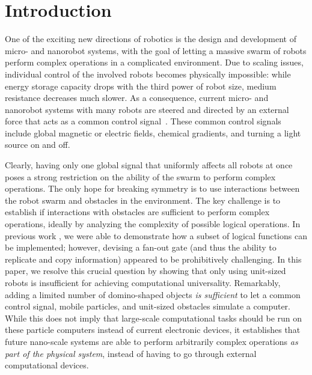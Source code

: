 \documentclass[letterpaper, 10 pt, conference]{ieeeconf}
\begin{document}

\section{Introduction}

One of the exciting new directions of robotics is the design and development
of micro- and nanorobot systems, with the goal of letting a massive swarm of robots
perform complex operations in a complicated environment. Due to scaling 
issues, individual control of the involved robots becomes physically impossible:
while energy storage capacity drops with the third power of robot size,
medium resistance decreases much slower. As a consequence,
current micro- and nanorobot systems with many robots are steered and
directed by an external force that acts as a common control signal~\cite{Donald2013,Chiang2011,Hsi-Wen2012,Diller2013,Jing2013,Ou2013,Lanauze2013}.
These common control signals include global magnetic or electric fields,
chemical gradients, and turning a light source on and off.  

Clearly, having only one global signal that uniformly affects all robots at once
poses a strong restriction on the ability of the swarm to perform complex operations.
The only hope for breaking symmetry is to use interactions between the robot swarm
and obstacles in the environment. The key challenge is to establish
if interactions with obstacles are sufficient to perform complex operations, ideally by analyzing the complexity of possible logical operations.
 In previous work \cite{Becker2013f,Becker2014,Becker2014a},
we were able to demonstrate how a subset of logical functions can be implemented;
however, devising a fan-out gate (and thus the ability to replicate and copy information)
appeared to be prohibitively challenging. In this paper, we resolve this crucial question by
showing that only using unit-sized robots is insufficient for achieving computational
universality. Remarkably, adding a limited number of domino-shaped objects {\em is sufficient}
to let a common control signal, mobile particles, and unit-sized obstacles
simulate a computer. While this does not imply that large-scale computational 
tasks should be run on these particle computers instead of current electronic
devices, it establishes that future nano-scale systems are able to perform
arbitrarily complex operations {\em as part of the physical system}, instead
of having to go through external computational devices.
\end{document}
